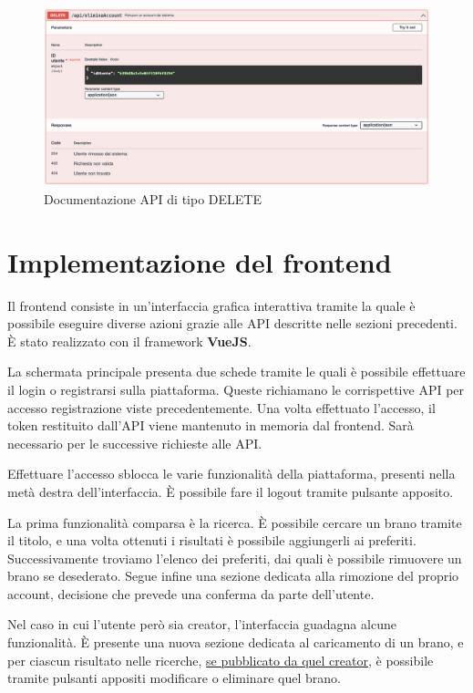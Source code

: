\documentclass[a4paper,12pt]{article}
\begin{document}
\begin{figure}[htp]
    \centering
    \includegraphics[width=\textwidth]{code/documentazione-delete.png}
    \caption{Documentazione API di tipo DELETE}
\end{figure}

\newpage
\section{Implementazione del frontend}

Il frontend consiste in un'interfaccia grafica interattiva tramite la quale è possibile eseguire diverse azioni grazie alle API descritte nelle sezioni precedenti. È stato realizzato con il framework \textbf{VueJS}.

La schermata principale presenta due schede tramite le quali è possibile effettuare il login o registrarsi sulla piattaforma. Queste richiamano le corrispettive API per accesso registrazione viste precedentemente. Una volta effettuato l'accesso, il token restituito dall'API viene mantenuto in memoria dal frontend. Sarà necessario per le successive richieste alle API.

Effettuare l'accesso sblocca le varie funzionalità della piattaforma, presenti nella metà destra dell'interfaccia. È possibile fare il logout tramite pulsante apposito.

La prima funzionalità comparsa è la ricerca. È possibile cercare un brano tramite il titolo, e una volta ottenuti i risultati è possibile aggiungerli ai preferiti. Successivamente troviamo l'elenco dei preferiti, dai quali è possibile rimuovere un brano se desederato. Segue infine una sezione dedicata alla rimozione del proprio account, decisione che prevede una conferma da parte dell'utente.

Nel caso in cui l'utente però sia creator, l'interfaccia guadagna alcune funzionalità. È presente una nuova sezione dedicata al caricamento di un brano, e per ciascun risultato nelle ricerche, \underline{se pubblicato da quel creator}, è possibile tramite pulsanti appositi modificare o eliminare quel brano.
\end{document}
